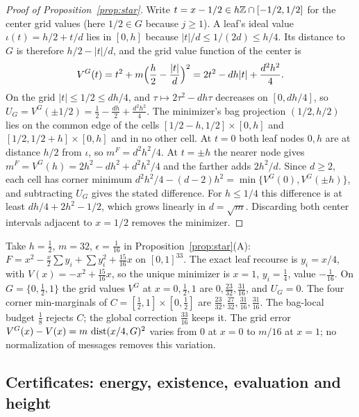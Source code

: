 \begin{proof}[Proof of Proposition~\ref{prop:star}]
Write $t=x-1/2\in h\mathbb Z\cap[-1/2,1/2]$ for the center grid values (here
$1/2\in G$ because $j\ge1$). A leaf's ideal value $\iota(t)=h/2+t/d$ lies in
$[0,h]$ because $|t|/d\le1/(2d)\le h/4$. Its distance to $G$ is therefore
$h/2-|t|/d$, and the grid value function of the center is
\[
V^G(t)=t^2+m\Bigl(\frac h2-\frac{|t|}d\Bigr)^2=2t^2-dh|t|+\frac{d^2h^2}4 .
\]
On the grid $|t|\le1/2\le dh/4$, and $\tau\mapsto2\tau^2-dh\tau$ decreases on
$[0,dh/4]$, so $U_G=V^G(\pm1/2)=\frac12-\frac{dh}2+\frac{d^2h^2}4$. The
minimizer's bag projection $(1/2,h/2)$ lies on the common edge of the cells
$[1/2-h,1/2]\times[0,h]$ and $[1/2,1/2+h]\times[0,h]$ and in no other cell.
At $t=0$ both leaf nodes $0,h$ are at distance $h/2$ from $\iota$, so
$m^F=d^2h^2/4$. At $t=\pm h$ the nearer node gives
$m^F=V^G(h)=2h^2-dh^2+d^2h^2/4$ and the farther adds $2h^2/d$. Since $d\ge2$,
each cell has corner minimum $d^2h^2/4-(d-2)h^2=\min\{V^G(0),V^G(\pm h)\}$,
and subtracting $U_G$ gives the stated difference. For $h\le1/4$ this
difference is at least $dh/4+2h^2-1/2$, which grows linearly in $d=\sqrt m$.
Discarding both center intervals adjacent to $x=1/2$ removes the minimizer.
\end{proof}

\begin{example}[An instance with $h=\frac12$]\label{ex:cr-star32}
Take $h=\frac12$, $m=32$, $\epsilon=\frac1{16}$ in
Proposition~\ref{prop:star}(A):
$F=x^2-\frac x2\sum y_i+\sum y_i^2+\frac{15}{16}x$ on $[0,1]^{33}$.
The exact leaf recourse is $y_i=x/4$, with $V(x)=-x^2+\frac{15}{16}x$, so
the unique minimizer is $x=1$, $y_i=\frac14$, value $-\frac1{16}$. On
$G=\{0,\frac12,1\}$ the grid values $V^G$ at $x=0,\frac12,1$ are
$0,\frac{23}{32},\frac{31}{16}$, and $U_G=0$. The four corner
min-marginals of $C=[\frac12,1]\times[0,\frac12]$ are
$\frac{23}{32},\frac{27}{32},\frac{31}{16},\frac{31}{16}$. The bag-local
budget $\frac18$ rejects $C$; the global correction $\frac{33}{16}$ keeps it.
The grid error $V^G(x)-V(x)=m\,\operatorname{dist}(x/4,G)^2$ varies from $0$ at $x=0$ to
$m/16$ at $x=1$; no normalization of messages removes this variation.
\end{example}

\subsection{Certificates: energy, existence, evaluation and height}

